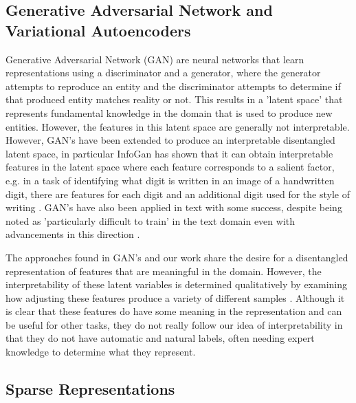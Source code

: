 \subsection{Generative Adversarial Network and Variational Autoencoders}

Generative Adversarial Network (GAN) \cite{Goodfellow2014} are neural networks that learn representations using a discriminator and a generator, where the generator attempts to reproduce an entity and the discriminator attempts to determine if that produced entity matches reality or not. This results in a 'latent space' that represents fundamental knowledge in the domain that is used to produce new entities. However, the features in this latent space are generally not interpretable. However, GAN's have been extended to produce an interpretable disentangled latent space, in particular  InfoGan has shown that it can obtain interpretable features in the latent space where each feature corresponds to a salient factor, e.g. in a task of identifying what digit is written in an image of a handwritten digit, there are features for each digit and an additional digit used for the style of writing \cite{Chen2016}. GAN's have  also been applied in text \cite{Bowman2015, Kim} with some success, despite being noted as 'particularly difficult to train' in the text domain \cite{Arjovsky2017} even with advancements in this direction \cite{Mescheder2018}.

The approaches found in GAN's and our work share the desire for a disentangled representation of features that are meaningful in the domain. However, the interpretability of these latent variables is determined qualitatively by examining how adjusting these features produce a variety of different samples \cite{Hsu2017}. Although it is clear that these features do have some meaning in the representation and can be useful for other tasks, they do not really follow our idea of interpretability in that they do not have automatic and natural labels, often needing expert knowledge to determine what they represent.

\subsection{Sparse Representations}

